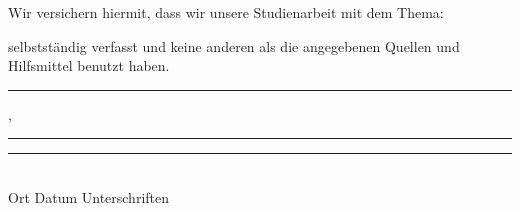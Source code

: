 \vfill
Wir versichern hiermit, dass wir unsere Studienarbeit mit dem Thema:
\begin{center}
	\vspace{1.0cm}
	\textit{\@title}
	\vspace{1.0cm}
\end{center}
selbstständig verfasst und
keine anderen als die angegebenen Quellen und Hilfsmittel benutzt haben. \\


\vfill

\rule{2cm}{0.4pt}, \rule{2,0cm}{0.4pt} \hspace{0.38cm} \rule{9cm}{0.4pt}\\
Ort
\hspace{1.2cm}
Datum
\hspace{1.2cm}
Unterschriften \textbf{\@author}